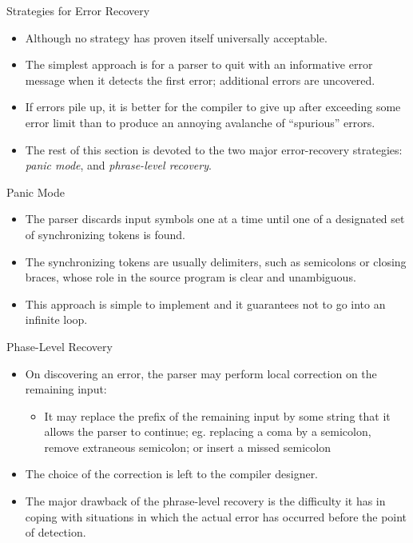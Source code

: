 \begin{bibunit}[apalike]
\begin{frame}{Strategies for Error Recovery}
	\begin{small}
	\vfill
	\begin{itemize}
	\item Although no strategy has proven itself universally acceptable.
	\vfill
	\item The simplest approach is for a parser to quit with an informative error message when it detects the first error; additional errors are uncovered.
	\vfill
	\item If errors pile up, it is better for the compiler to give up after exceeding some error limit than to produce an annoying avalanche of ``spurious'' errors.
	\vfill
	\item The rest of this section is devoted to the two major error-recovery strategies: \emph{panic mode}, and \emph{phrase-level recovery}.
	\end{itemize}
	\end{small}
\end{frame}

\begin{frame}{Panic Mode}
	\begin{itemize}
	\item The parser discards input symbols one at a time until one of a designated set of synchronizing tokens is found.
	\vfill
	\item The synchronizing tokens are usually delimiters, such as semicolons or closing braces, whose role in the source program is clear and unambiguous.
	\vfill
	\item This approach is simple to implement and it guarantees not to go into an infinite loop.
	\end{itemize}
\end{frame}

\begin{frame}{Phase-Level Recovery}
	\begin{itemize}
	\item On discovering an error, the parser may perform local correction on the remaining input:
		\begin{itemize}
		\item It may replace the prefix of the remaining input by some string that it allows the parser to continue; eg. replacing a coma by a semicolon, remove extraneous semicolon; or insert a missed semicolon
		\end{itemize}
	\vfill
	\item The choice of the correction is left to the compiler designer.
	\vfill
	\item The major drawback of the phrase-level recovery is the difficulty it has in coping with situations in which the actual error has occurred before the point of detection.
	\end{itemize}
\end{frame}


\end{bibunit}
